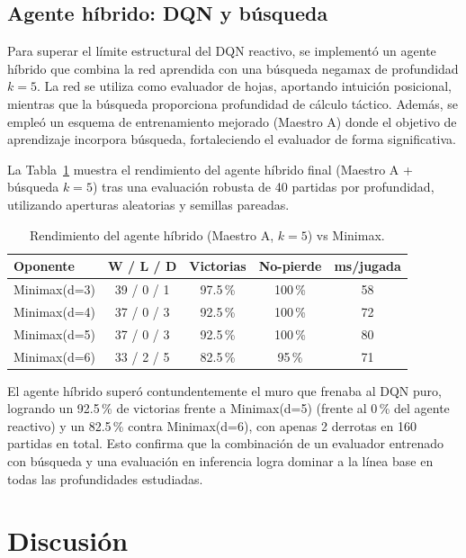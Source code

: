 \documentclass[11pt,a4paper]{article}
\begin{document}

\subsection{Agente híbrido: DQN y búsqueda}

Para superar el límite estructural del DQN reactivo, se implementó un agente híbrido que combina la red aprendida con una búsqueda negamax de profundidad $k=5$. La red se utiliza como evaluador de hojas, aportando intuición posicional, mientras que la búsqueda proporciona profundidad de cálculo táctico. Además, se empleó un esquema de entrenamiento mejorado (Maestro A) donde el objetivo de aprendizaje incorpora búsqueda, fortaleciendo el evaluador de forma significativa.

La Tabla~\ref{tab:hibrido} muestra el rendimiento del agente híbrido final (Maestro A + búsqueda $k=5$) tras una evaluación robusta de 40 partidas por profundidad, utilizando aperturas aleatorias y semillas pareadas.

\begin{table}[H]
\centering
\caption{Rendimiento del agente híbrido (Maestro A, $k=5$) vs Minimax.}
\label{tab:hibrido}
\begin{tabular}{lcccc}
\toprule
Oponente & W / L / D & Victorias & No-pierde & ms/jugada \\
\midrule
Minimax(d=3) & 39 / 0 / 1 & 97.5\,\% & 100\,\% & 58 \\
Minimax(d=4) & 37 / 0 / 3 & 92.5\,\% & 100\,\% & 72 \\
Minimax(d=5) & 37 / 0 / 3 & 92.5\,\% & 100\,\% & 80 \\
Minimax(d=6) & 33 / 2 / 5 & 82.5\,\% & 95\,\%  & 71 \\
\bottomrule
\end{tabular}
\end{table}

El agente híbrido superó contundentemente el muro que frenaba al DQN puro, logrando un 92.5\,\% de victorias frente a Minimax(d=5) (frente al 0\,\% del agente reactivo) y un 82.5\,\% contra Minimax(d=6), con apenas 2 derrotas en 160 partidas en total. Esto confirma que la combinación de un evaluador entrenado con búsqueda y una evaluación en inferencia logra dominar a la línea base en todas las profundidades estudiadas.

\section{Discusión}
\end{document}
